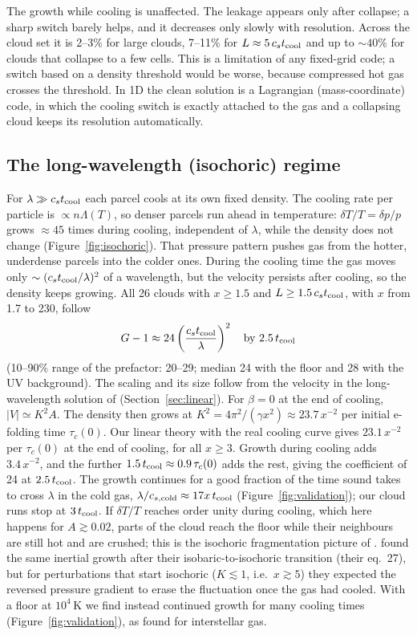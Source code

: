 \documentclass[11pt]{article}
\newcommand{\tcool}{t_{\rm cool}}
\newcommand{\cstc}{c_s t_{\rm cool}}
\begin{document}
The growth while cooling is unaffected. The leakage appears only after collapse;
a sharp switch barely helps, and it decreases only slowly with resolution. Across
the cloud set it is 2--3\% for large clouds, 7--11\% for $L\approx5\,\cstc$ and up
to $\sim40\%$ for clouds that collapse to a few cells. This is a limitation of any
fixed-grid code; a switch based on a density threshold would be worse, because
compressed hot gas crosses the threshold. In 1D the clean solution is a
Lagrangian (mass-coordinate) code, in which the cooling switch is exactly
attached to the gas and a collapsing cloud keeps its resolution automatically.

\subsection{The long-wavelength (isochoric) regime}
\label{sec:isochoric}
For $\lambda\gg\cstc$ each parcel cools at its own fixed density. The cooling rate
per particle is $\propto n\Lambda(T)$, so denser parcels run ahead in temperature:
$\delta T/T=\delta p/p$ grows $\approx45$ times during cooling, independent of
$\lambda$, while the density does not change (Figure~\ref{fig:isochoric}). That
pressure pattern pushes gas from the hotter, underdense parcels into the colder
ones. During the cooling time the gas moves only $\sim(\cstc/\lambda)^2$ of a
wavelength, but the velocity persists after cooling, so the density keeps
growing. All 26 clouds with $x\ge1.5$ and $L\ge1.5\,\cstc$, with
$x$ from 1.7 to 230, follow
\begin{equation}
G-1\approx24\left(\frac{\cstc}{\lambda}\right)^2\quad\text{by }2.5\,\tcool
\label{eq:isoscaling}
\end{equation}
(10--90\% range of the prefactor: 20--29; median 24 with the floor and 28 with
the UV background). The scaling and its size follow from the velocity in the
long-wavelength solution of \citet{burkert00} (Section~\ref{sec:linear}). For
$\beta=0$ at the end of cooling, $|V|\simeq K^2A$. The density then grows at
$K^2=4\pi^2/(\gamma x^2)\approx23.7\,x^{-2}$ per initial e-folding time $\tau_c(0)$.
Our linear theory with the real cooling curve gives $23.1\,x^{-2}$ per $\tau_c(0)$ at
the end of cooling, for all $x\ge3$. Growth during cooling adds $3.4\,x^{-2}$, and
the further $1.5\,\tcool\approx0.9\,\tau_c(0)$ adds the rest, giving the coefficient of
24 at $2.5\,\tcool$. The growth continues
for a good fraction of the time sound takes to cross $\lambda$ in the cold gas,
$\lambda/c_{s,\rm cold}\approx17x\,\tcool$ (Figure~\ref{fig:validation}); our
cloud runs stop at $3\,\tcool$. If $\delta T/T$ reaches order
unity during cooling, which here happens for $A\gtrsim0.02$, parts of the cloud
reach the floor while their neighbours are still hot and are crushed; this is
the isochoric fragmentation picture of \citet{mccourt18}. \citet{burkert00} found the
same inertial growth after their isobaric-to-isochoric transition (their eq.~27),
but for perturbations that start isochoric ($K\lesssim1$, i.e.\ $x\gtrsim5$) they
expected the reversed pressure gradient to erase the fluctuation once the gas had
cooled. With a floor at $10^4$\,K we find instead continued growth for many cooling
times (Figure~\ref{fig:validation}), as \citet{schwarz72} found for interstellar
gas.
\end{document}
